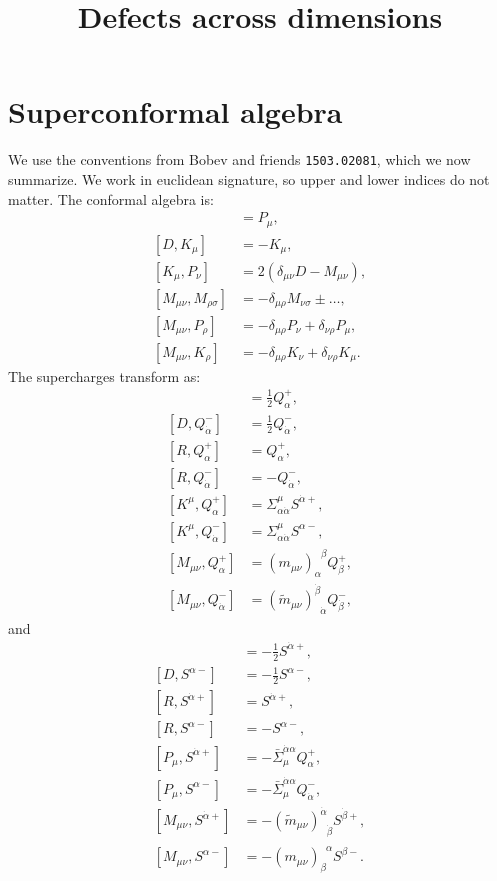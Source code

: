 \documentclass[letterpaper]{article}
\title{Defects across dimensions}
\author{}
\let\Oldsection\section
\renewcommand{\section}{\FloatBarrier\Oldsection}
\def\a{{\alpha}}
\def\b{{\beta}}
\def\ad{{\dot{\alpha}}}
\def\bd{{\dot{\beta}}}
\def\ph{\phantom}
\def \ph{\phantom}
\begin{document}
\maketitle

\section{Superconformal algebra}

We use the conventions from Bobev and friends \texttt{1503.02081}, which we now summarize.
We work in euclidean signature, so upper and lower indices do not matter.
The conformal algebra is:
\begin{align}
 [ D, P_\mu] & =   P_\mu, \\
 [ D, K_\mu] & = - K_\mu, \\
 [ K_\mu, P_\nu] & = 2 \left( \delta_{\mu\nu} D - M_{\mu\nu} \right), \\
 [ M_{\mu\nu}, M_{\rho\sigma} ] & = -\delta_{\mu\rho} M_{\nu\sigma} \pm \ldots, \\
 [ M_{\mu\nu}, P_\rho] & = - \delta_{\mu\rho} P_\nu + \delta_{\nu\rho} P_\mu, \\
 [ M_{\mu\nu}, K_\rho] & = - \delta_{\mu\rho} K_\nu + \delta_{\nu\rho} K_\mu.
\end{align}
The supercharges transform as:
\begin{align}
 [D, Q^+_\a ] & = \tfrac{1}{2} Q^+_\a, \\
 [D, Q^-_\ad] & = \tfrac{1}{2} Q^-_\ad, \\
 [R, Q^+_\a ] & =  Q^+_\a, \\
 [R, Q^-_\ad] & = -Q^-_\ad, \\
 [K^\mu, Q^+_\a]  & = \Sigma^\mu_{\a\ad} S^{\ad +}, \\
 [K^\mu, Q^-_\ad] & = \Sigma^\mu_{\a\ad} S^{\a  -}, \\
 [M_{\mu\nu}, Q^+_\a]  & = (       m_{\mu\nu})_\a^{\ph \a\b}    Q^{+}_\b, \\
 [M_{\mu\nu}, Q^-_\ad] & = (\tilde m_{\mu\nu})^\bd_{\ph \bd\ad} Q^{-}_\bd,
\end{align}
and
\begin{align}
 [D, S^{\ad+} ] & = - \tfrac{1}{2} S^{\ad+}, \\
 [D, S^{\a -} ] & = - \tfrac{1}{2} S^{\a -}, \\
 [R, S^{\ad+} ] & =  S^{\ad+}, \\
 [R, S^{\a -} ] & = -S^{\a -}, \\
 [P_\mu, S^{\ad+}] & = - \bar \Sigma_\mu^{\ad\a} Q^+_\a, \\
 [P_\mu, S^{\a -}] & = - \bar \Sigma_\mu^{\ad\a} Q^-_\ad, \\
 [M_{\mu\nu}, S^{\ad+}] & = - (\tilde m_{\mu\nu})^\ad_{\ph \ad\bd} S^{\bd+}, \\
 [M_{\mu\nu}, S^{\a -}] & = - (       m_{\mu\nu})_\b ^{\ph \b\a}   S^{\b-}.
\end{align}
\end{document}
